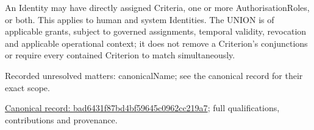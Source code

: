 An Identity may have directly assigned Criteria, one or more AuthorisationRoles,
or both. This applies to human and system Identities. The UNION is of applicable
grants, subject to governed assignments, temporal validity, revocation and
applicable operational context; it does not remove a Criterion's conjunctions
or require every contained Criterion to match simultaneously.


{\small Recorded unresolved matters: canonicalName; see the canonical record for their exact scope.}\par
{\footnotesize \href{../../../../continuum/application/data-object/bad6431f87bd4bf59645c0962cc219a7.md}{Canonical record: bad6431f87bd4bf59645c0962cc219a7}; full qualifications, contributions and provenance.}\par
